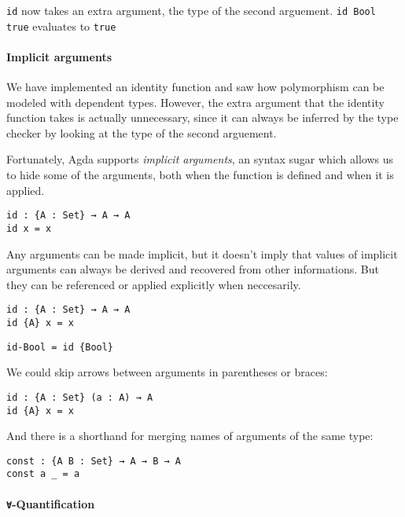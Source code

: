 \documentclass[12pt, a4paper]{article}
\begin{document}
{\lstinline|id|} now takes an extra argument, the type of the second arguement.
{\lstinline|id Bool true|} evaluates to {\lstinline|true|}

\paragraph{Implicit arguments}

We have implemented an identity function and saw how polymorphism can be modeled
with dependent types. However, the extra argument that the identity function
takes is actually unnecessary, since it can always be inferred by the type
checker by looking at the type of the second arguement.

Fortunately, Agda supports \textit{implicit arguments}, an syntax sugar which
allows us to hide some of the arguments, both when the function is defined and
when it is applied.

\begin{lstlisting}
id : {A : Set} → A → A
id x = x
\end{lstlisting}

Any arguments can be made implicit, but it doesn't imply that values of
implicit arguments can always be derived and recovered from other informations.
But they can be referenced or applied explicitly when neccesarily.

\begin{lstlisting}
id : {A : Set} → A → A
id {A} x = x
\end{lstlisting}

\begin{lstlisting}
id-Bool = id {Bool}
\end{lstlisting}

We could skip arrows between arguments in parentheses or braces:

\begin{lstlisting}
id : {A : Set} (a : A) → A
id {A} x = x
\end{lstlisting}

And there is a shorthand for merging names of arguments of the same type:

\begin{lstlisting}
const : {A B : Set} → A → B → A
const a _ = a
\end{lstlisting}

\paragraph{\texttt{∀}-Quantification}
\end{document}
